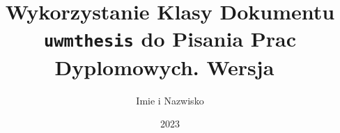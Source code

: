 \documentclass[wmii, inf, mgr]{uwmthesis}
\date{2023}
\title{Wykorzystanie Klasy Dokumentu \texttt{uwmthesis} do Pisania Prac Dyplomowych. Wersja~\version}
\author{Imie i Nazwisko}
\begin{document}
\maketitle

\tableofcontents









\nocite{Brune}
\nocite{AlonsoRuiz}
\printbibliography
\end{document}
